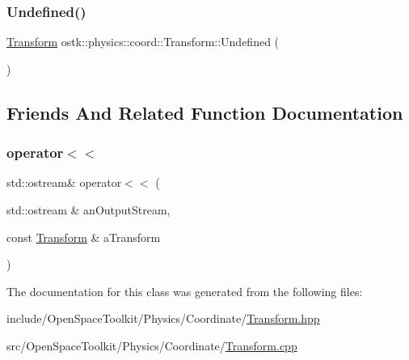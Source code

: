 \subsubsection{\texorpdfstring{Undefined()}{Undefined()}}
{\footnotesize\ttfamily \hyperlink{classostk_1_1physics_1_1coord_1_1_transform}{Transform} ostk\+::physics\+::coord\+::\+Transform\+::\+Undefined (\begin{DoxyParamCaption}{ }\end{DoxyParamCaption})\hspace{0.3cm}{\ttfamily [static]}}



\subsection{Friends And Related Function Documentation}
\mbox{\label{classostk_1_1physics_1_1coord_1_1_transform_ae46ab7a297c23b757fd6f41bf30c4054}} 
\subsubsection{\texorpdfstring{operator$<$$<$}{operator<<}}
{\footnotesize\ttfamily std\+::ostream\& operator$<$$<$ (\begin{DoxyParamCaption}\item[{std\+::ostream \&}]{an\+Output\+Stream,  }\item[{const \hyperlink{classostk_1_1physics_1_1coord_1_1_transform}{Transform} \&}]{a\+Transform }\end{DoxyParamCaption})\hspace{0.3cm}{\ttfamily [friend]}}



The documentation for this class was generated from the following files\+:\begin{DoxyCompactItemize}
\item 
include/\+Open\+Space\+Toolkit/\+Physics/\+Coordinate/\hyperlink{_transform_8hpp}{Transform.\+hpp}\item 
src/\+Open\+Space\+Toolkit/\+Physics/\+Coordinate/\hyperlink{_transform_8cpp}{Transform.\+cpp}\end{DoxyCompactItemize}
